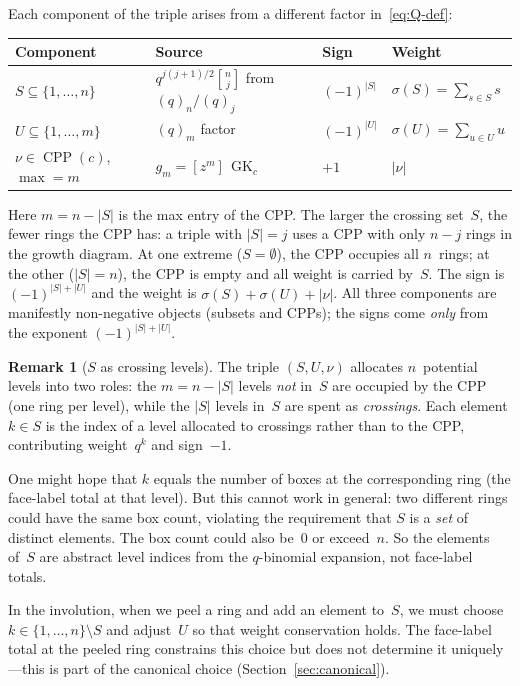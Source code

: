 \documentclass[11pt]{article}
\newcommand{\GK}{\operatorname{GK}}
\newcommand{\CPP}{\operatorname{CPP}}
\newcommand{\qbin}[2]{\genfrac{[}{]}{0pt}{}{#1}{#2}}
\theoremstyle{plain}
\theoremstyle{definition}
\newtheorem{remark}[theorem]{Remark}
\begin{document}
Each component of the triple arises from a different factor
in~\eqref{eq:Q-def}:
\begin{center}
\renewcommand{\arraystretch}{1.3}
\begin{tabular}{l|l|l|l}
\textbf{Component} & \textbf{Source} & \textbf{Sign} & \textbf{Weight}
\\ \hline
$S \subseteq \{1,\ldots,n\}$
  & $q^{j(j+1)/2}\qbin{n}{j}$ from $(q)_n/\!(q)_j$
  & $(-1)^{|S|}$
  & $\sigma(S) = \sum_{s \in S} s$
\\
$U \subseteq \{1,\ldots,m\}$
  & $(q)_m$ factor
  & $(-1)^{|U|}$
  & $\sigma(U) = \sum_{u \in U} u$
\\
$\nu \in \CPP(c)$, $\max = m$
  & $g_m = [z^m]\,\GK_c$
  & $+1$
  & $|\nu|$
\end{tabular}
\end{center}

\noindent
Here $m = n - |S|$ is the max entry of the CPP\@.
The larger the crossing set~$S$, the fewer rings the CPP
has: a triple with $|S| = j$ uses a CPP with only $n - j$
rings in the growth diagram.  At one extreme ($S = \emptyset$),
the CPP occupies all $n$~rings; at the other ($|S| = n$),
the CPP is empty and all weight is carried by~$S$.
The sign is $(-1)^{|S| + |U|}$ and the weight is
$\sigma(S) + \sigma(U) + |\nu|$.  All three components are
manifestly non-negative objects (subsets and CPPs); the signs
come \emph{only} from the exponent $(-1)^{|S|+|U|}$.

\begin{remark}[$S$ as crossing levels]
\label{rmk:S-levels}
The triple $(S, U, \nu)$ allocates $n$~potential levels into two
roles: the $m = n - |S|$ levels \emph{not} in~$S$ are occupied by
the CPP (one ring per level), while the $|S|$ levels in~$S$ are
spent as \emph{crossings}.  Each element $k \in S$ is the index of
a level allocated to crossings rather than to the CPP, contributing
weight~$q^k$ and sign~$-1$.

One might hope that $k$ equals the number of boxes at the
corresponding ring (the face-label total at that level).  But this
cannot work in general: two different rings could have the same
box count, violating the requirement that $S$ is a \emph{set} of
distinct elements.  The box count could also be~$0$ or exceed~$n$.
So the elements of~$S$ are abstract level indices from the
$q$-binomial expansion, not face-label totals.

In the involution, when we peel a ring and add an element to~$S$,
we must choose $k \in \{1, \ldots, n\} \setminus S$ and adjust~$U$
so that weight conservation holds.  The face-label total at the
peeled ring constrains this choice but does not determine it
uniquely---this is part of the canonical choice
(Section~\ref{sec:canonical}).
\end{remark}
\end{document}
